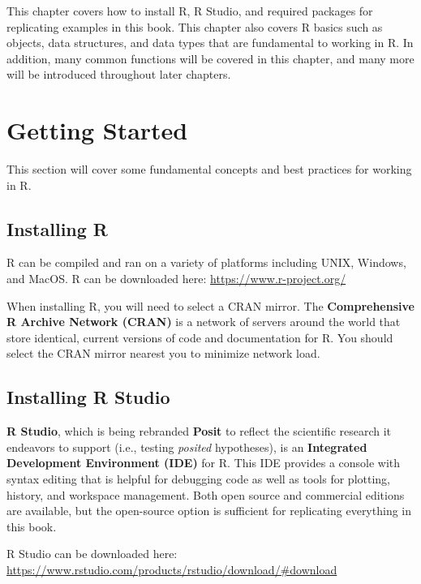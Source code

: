 \documentclass[
]{book}
\begin{document}
This chapter covers how to install R, R Studio, and required packages for replicating examples in this book. This chapter also covers R basics such as objects, data structures, and data types that are fundamental to working in R. In addition, many common functions will be covered in this chapter, and many more will be introduced throughout later chapters.

\hypertarget{getting-started-1}{%
\section{Getting Started}\label{getting-started-1}}

This section will cover some fundamental concepts and best practices for working in R.

\hypertarget{installing-r}{%
\subsection{Installing R}\label{installing-r}}

R can be compiled and ran on a variety of platforms including UNIX, Windows, and MacOS. R can be downloaded here: \url{https://www.r-project.org/}

When installing R, you will need to select a CRAN mirror. The \textbf{Comprehensive R Archive Network (CRAN)} is a network of servers around the world that store identical, current versions of code and documentation for R. You should select the CRAN mirror nearest you to minimize network load.

\hypertarget{installing-r-studio}{%
\subsection{Installing R Studio}\label{installing-r-studio}}

\textbf{R Studio}, which is being rebranded \textbf{Posit} to reflect the scientific research it endeavors to support (i.e., testing \emph{posited} hypotheses), is an \textbf{Integrated Development Environment (IDE)} for R. This IDE provides a console with syntax editing that is helpful for debugging code as well as tools for plotting, history, and workspace management. Both open source and commercial editions are available, but the open-source option is sufficient for replicating everything in this book.

R Studio can be downloaded here: \url{https://www.rstudio.com/products/rstudio/download/\#download}
\end{document}

